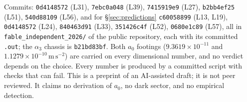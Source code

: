 \documentclass[11pt,letterpaper]{article}
\newcommand{\ms}{\,\mathrm{m\,s^{-2}}}
\begin{document}
Commits: \texttt{0d4148572} (L31), \texttt{7ebc0a048} (L39), \texttt{7415919e9} (L27), \texttt{b2bb4ef25} (L51), \texttt{540d88109} (L56), and for \S\ref{sec:predictions} \texttt{c60058899} (L13, L19), \texttt{0d4148572} (L24), \texttt{840463d91} (L33), \texttt{351426c4f} (L52), \texttt{0680e1c89} (L57), all in \texttt{fable\_independent\_2026/} of the public repository, each with its committed \texttt{.out}; the $\alpha_3$ chassis is \texttt{b21bd83bf}. Both $a_0$ footings ($9.3619\times10^{-11}$ and $1.1279\times10^{-10}\ms$) are carried on every dimensional number, and no verdict depends on the choice. Every number is produced by a committed script with checks that can fail. This is a preprint of an AI-assisted draft; it is not peer reviewed. It claims no derivation of $a_0$, no dark sector, and no empirical detection.
\end{document}
